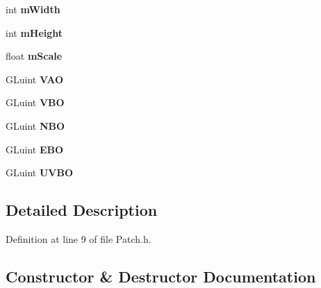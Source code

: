 \begin{DoxyCompactItemize}
\item 
int {\bfseries m\+Width}\hypertarget{class_patch_a84408002534919c7ebe17f336548b1b2}{}\label{class_patch_a84408002534919c7ebe17f336548b1b2}

\item 
int {\bfseries m\+Height}\hypertarget{class_patch_afcafdb606806884f266c1be6e28c499e}{}\label{class_patch_afcafdb606806884f266c1be6e28c499e}

\item 
float {\bfseries m\+Scale}\hypertarget{class_patch_ac4a3dafd158a7fae66c6bea99b75e9a4}{}\label{class_patch_ac4a3dafd158a7fae66c6bea99b75e9a4}

\item 
G\+Luint {\bfseries V\+AO}\hypertarget{class_patch_a45679d9388d67dc900e2c11038124ba5}{}\label{class_patch_a45679d9388d67dc900e2c11038124ba5}

\item 
G\+Luint {\bfseries V\+BO}\hypertarget{class_patch_a8f19701433a5a7d0ba92bd53e2b9e09d}{}\label{class_patch_a8f19701433a5a7d0ba92bd53e2b9e09d}

\item 
G\+Luint {\bfseries N\+BO}\hypertarget{class_patch_a184323059ea595dd22186beeba0a5f84}{}\label{class_patch_a184323059ea595dd22186beeba0a5f84}

\item 
G\+Luint {\bfseries E\+BO}\hypertarget{class_patch_ae244bc36389081cfbbb0385e496d7f40}{}\label{class_patch_ae244bc36389081cfbbb0385e496d7f40}

\item 
G\+Luint {\bfseries U\+V\+BO}\hypertarget{class_patch_aa7dc58c0c17fe9ad1006ca92c3d88c23}{}\label{class_patch_aa7dc58c0c17fe9ad1006ca92c3d88c23}

\end{DoxyCompactItemize}


\subsection{Detailed Description}


Definition at line 9 of file Patch.\+h.



\subsection{Constructor \& Destructor Documentation}
